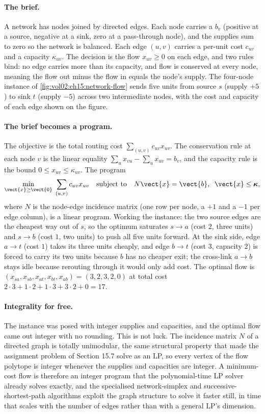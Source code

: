 \paragraph{The brief.}
A network has nodes joined by directed edges. Each node carries a
 $b_{v}$ (positive at a source, negative at a sink, zero
at a pass-through node), and the supplies sum to zero so the network is
balanced. Each edge $(u, v)$ carries a per-unit cost $c_{uv}$ and a
capacity $\kappa_{uv}$. The decision is the flow $x_{uv} \geq 0$ on each
edge, and two rules bind: no edge carries more than its capacity, and
flow is conserved at every node, meaning the flow out minus the flow in
equals the node's supply. The four-node instance of
\cref{fig:vol02:ch15:network-flow} sends five units from source $s$
(supply $+5$) to sink $t$ (supply $-5$) across two intermediate nodes,
with the cost and capacity of each edge shown on the figure.

\paragraph{The brief becomes a program.}
The objective is the total routing cost $\sum_{(u,v)} c_{uv} x_{uv}$.
The conservation rule at each node $v$ is the linear equality
$\sum_{u} x_{vu} - \sum_{u} x_{uv} = b_{v}$, and the capacity rule is the
bound $0 \leq x_{uv} \leq \kappa_{uv}$. The program
\[
\min_{\vect{x} \geq \vect{0}} \; \sum_{(u,v)} c_{uv} x_{uv}
\quad \text{subject to} \quad
N \vect{x} = \vect{b}, \;\; \vect{x} \leq \boldsymbol{\kappa},
\]
where $N$ is the node-edge incidence matrix (one row per node, a $+1$
and a $-1$ per edge column), is a linear program. Working the instance:
the two source edges are the cheapest way out of $s$, so the optimum
saturates $s\!\to\!a$ (cost $2$, three units) and $s\!\to\!b$ (cost $1$,
two units) to push all five units forward. At the sink side, edge
$a\!\to\!t$ (cost $1$) takes its three units cheaply, and edge
$b\!\to\!t$ (cost $3$, capacity $2$) is forced to carry its two units
because $b$ has no cheaper exit; the cross-link $a\!\to\!b$ stays idle
because rerouting through it would only add cost. The optimal flow is
$(x_{sa}, x_{sb}, x_{at}, x_{bt}, x_{ab}) = (3, 2, 3, 2, 0)$ at total
cost $2\cdot 3 + 1\cdot 2 + 1\cdot 3 + 3\cdot 2 + 0 = 17$.

\paragraph{Integrality for free.}
The instance was posed with integer supplies and capacities, and the
optimal flow came out integer with no rounding. This is not luck. The
incidence matrix $N$ of a directed graph is totally unimodular, the same
structural property that made the assignment problem of Section 15.7
solve as an LP, so every vertex of the flow polytope is integer whenever
the supplies and capacities are integer. A minimum-cost flow is
therefore an integer program that the polynomial-time LP solver already
solves exactly, and the specialised network-simplex and
successive-shortest-path algorithms exploit the graph structure to solve
it faster still, in time that scales with the number of edges rather
than with a general LP's dimension.


